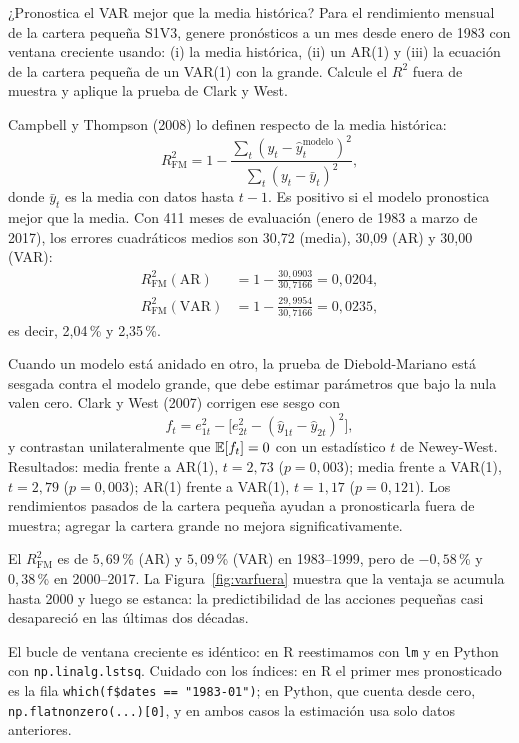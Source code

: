 \begin{ejresuelto}{¿Pronostica el VAR mejor que la media histórica?}\label{ej:varfuera}
\enunciado Para el rendimiento mensual de la cartera pequeña S1V3, genere pronósticos a un mes desde enero de
1983 con ventana creciente usando: (i) la media histórica, (ii) un AR(1) y (iii) la ecuación de la cartera
pequeña de un VAR(1) con la grande. Calcule el $R^2$ fuera de muestra y aplique la prueba de Clark y West.

\solucion
{} Campbell y Thompson (2008) lo definen respecto de la media histórica:
\[
  R^2_{\text{FM}}=1-\frac{\sum_t(y_t-\hat y_t^{\text{modelo}})^2}{\sum_t(y_t-\bar y_t)^2},
\]
donde $\bar y_t$ es la media con datos hasta $t-1$. Es positivo si el modelo pronostica mejor que la media. Con
411 meses de evaluación (enero de 1983 a marzo de 2017), los errores cuadráticos medios son 30,72 (media), 30,09
(AR) y 30,00 (VAR):
\begin{align*}
  R^2_{\text{FM}}(\text{AR}) &= 1-\frac{30{,}0903}{30{,}7166}=0{,}0204,\\
  R^2_{\text{FM}}(\text{VAR}) &= 1-\frac{29{,}9954}{30{,}7166}=0{,}0235,
\end{align*}
es decir, 2,04\,\% y 2,35\,\%.

 Cuando un modelo está anidado en otro, la prueba de Diebold-Mariano está
sesgada contra el modelo grande, que debe estimar parámetros que bajo la nula valen cero. Clark y West (2007)
corrigen ese sesgo con
\[
  f_t=e_{1t}^2-\bigl[e_{2t}^2-(\hat y_{1t}-\hat y_{2t})^2\bigr],
\]
y contrastan unilateralmente que $\mathbb{E}[f_t]=0$ con un estadístico $t$ de Newey-West. Resultados: media frente a
AR(1), $t=2{,}73$ ($p=0{,}003$); media frente a VAR(1), $t=2{,}79$ ($p=0{,}003$); AR(1) frente a VAR(1), $t=1{,}17$
($p=0{,}121$). Los rendimientos pasados de la cartera pequeña ayudan a pronosticarla fuera de muestra; agregar la
cartera grande no mejora significativamente.

 El $R^2_{\text{FM}}$ es de $5{,}69$\,\% (AR) y $5{,}09$\,\% (VAR) en
1983--1999, pero de $-0{,}58$\,\% y $0{,}38$\,\% en 2000--2017. La Figura~\ref{fig:varfuera} muestra que la ventaja se
acumula hasta 2000 y luego se estanca: la predictibilidad de las acciones pequeñas casi desapareció en las
últimas dos décadas.


\RvsPy El bucle de ventana creciente es idéntico: en R reestimamos con \texttt{lm} y en Python con
\texttt{np.linalg.lstsq}. Cuidado con los índices: en R el primer mes pronosticado es la fila
\texttt{which(f\$dates == "1983-01")}; en Python, que cuenta desde cero, \texttt{np.flatnonzero(...)[0]}, y en
ambos casos la estimación usa solo datos anteriores.


\end{ejresuelto}
